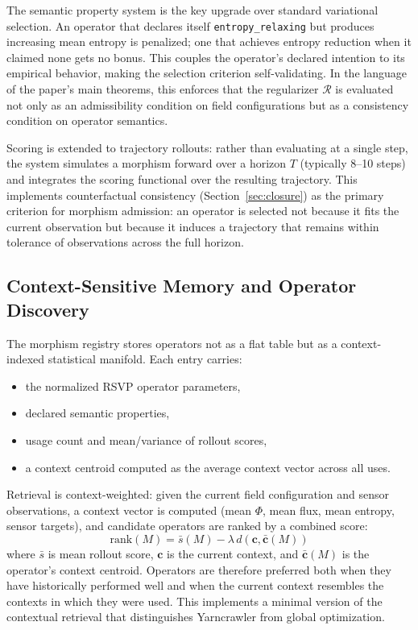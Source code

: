 \documentclass[11pt, oneside]{article}
\begin{document}
The semantic property system is the key upgrade over standard variational selection. An
operator that declares itself \texttt{entropy\_relaxing} but produces increasing mean
entropy is penalized; one that achieves entropy reduction when it claimed none gets no
bonus. This couples the operator's declared intention to its empirical behavior, making
the selection criterion self-validating. In the language of the paper's main theorems,
this enforces that the regularizer $\mathcal{R}$ is evaluated not only as an
admissibility condition on field configurations but as a consistency condition on
operator semantics.

Scoring is extended to trajectory rollouts: rather than evaluating at a single step, the
system simulates a morphism forward over a horizon $T$ (typically 8--10 steps) and
integrates the scoring functional over the resulting trajectory. This implements
counterfactual consistency (Section~\ref{sec:closure}) as the primary criterion for
morphism admission: an operator is selected not because it fits the current observation
but because it induces a trajectory that remains within tolerance of observations across
the full horizon.

\subsection{Context-Sensitive Memory and Operator Discovery}

The morphism registry stores operators not as a flat table but as a context-indexed
statistical manifold. Each entry carries:
\begin{itemize}
\item the normalized RSVP operator parameters,
\item declared semantic properties,
\item usage count and mean/variance of rollout scores,
\item a context centroid computed as the average context vector across all uses.
\end{itemize}
Retrieval is context-weighted: given the current field configuration and sensor
observations, a context vector is computed (mean $\Phi$, mean flux, mean entropy, sensor
targets), and candidate operators are ranked by a combined score:
\[
\mathrm{rank}(M) = \bar{s}(M) - \lambda\, d(\mathbf{c}, \bar{\mathbf{c}}(M))
\]
where $\bar{s}$ is mean rollout score, $\mathbf{c}$ is the current context, and
$\bar{\mathbf{c}}(M)$ is the operator's context centroid. Operators are therefore
preferred both when they have historically performed well and when the current context
resembles the contexts in which they were used. This implements a minimal version of the
contextual retrieval that distinguishes Yarncrawler from global optimization.
\end{document}
